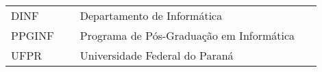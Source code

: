 

\begin{listaacron}

\begin{longtable}[l]{p{0.2\linewidth}p{0.7\linewidth}}
DINF & Departamento de Informática\\
PPGINF & Programa de Pós-Graduação em Informática\\
UFPR & Universidade Federal do Paraná\\
\end{longtable}

\end{listaacron}

